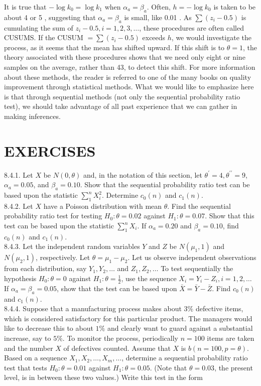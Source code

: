 It is true that $-\log k_{0}=\log k_{1}$ when $\alpha_{a}=\beta_{a}$. Often, $h=-\log k_{0}$ is taken to be about 4 or 5 , suggesting that $\alpha_{a}=\beta_{a}$ is small, like 0.01 . As $\sum\left(z_{i}-0.5\right)$ is cumulating the sum of $z_{i}-0.5, i=1,2,3, \ldots$, these procedures are often called CUSUMS. If the CUSUM $=\sum\left(z_{i}-0.5\right)$ exceeds $h$, we would investigate the process, as it seems that the mean has shifted upward. If this shift is to $\theta=1$, the theory associated with these procedures shows that we need only eight or nine samples on the average, rather than 43, to detect this shift. For more information about these methods, the reader is referred to one of the many books on quality improvement through statistical methods. What we would like to emphasize here is that through sequential methods (not only the sequential probability ratio test), we should take advantage of all past experience that we can gather in making inferences.

\section*{EXERCISES}
8.4.1. Let $X$ be $N(0, \theta)$ and, in the notation of this section, let $\theta^{\prime}=4, \theta^{\prime \prime}=9$, $\alpha_{a}=0.05$, and $\beta_{a}=0.10$. Show that the sequential probability ratio test can be based upon the statistic $\sum_{1}^{n} X_{i}^{2}$. Determine $c_{0}(n)$ and $c_{1}(n)$.\\
8.4.2. Let $X$ have a Poisson distribution with mean $\theta$. Find the sequential probability ratio test for testing $H_{0}: \theta=0.02$ against $H_{1}: \theta=0.07$. Show that this test can be based upon the statistic $\sum_{1}^{n} X_{i}$. If $\alpha_{a}=0.20$ and $\beta_{a}=0.10$, find $c_{0}(n)$ and $c_{1}(n)$.\\
8.4.3. Let the independent random variables $Y$ and $Z$ be $N\left(\mu_{1}, 1\right)$ and $N\left(\mu_{2}, 1\right)$, respectively. Let $\theta=\mu_{1}-\mu_{2}$. Let us observe independent observations from each distribution, say $Y_{1}, Y_{2}, \ldots$ and $Z_{1}, Z_{2}, \ldots$ To test sequentially the hypothesis $H_{0}: \theta=0$ against $H_{1}: \theta=\frac{1}{2}$, use the sequence $X_{i}=Y_{i}-Z_{i}, i=1,2, \ldots$ If $\alpha_{a}=\beta_{a}=0.05$, show that the test can be based upon $\bar{X}=\bar{Y}-\bar{Z}$. Find $c_{0}(n)$ and $c_{1}(n)$.\\
8.4.4. Suppose that a manufacturing process makes about $3 \%$ defective items, which is considered satisfactory for this particular product. The managers would like to decrease this to about $1 \%$ and clearly want to guard against a substantial increase, say to $5 \%$. To monitor the process, periodically $n=100$ items are taken and the number $X$ of defectives counted. Assume that $X$ is $b(n=100, p=\theta)$. Based on a sequence $X_{1}, X_{2}, \ldots, X_{m}, \ldots$, determine a sequential probability ratio test that tests $H_{0}: \theta=0.01$ against $H_{1}: \theta=0.05$. (Note that $\theta=0.03$, the present level, is in between these two values.) Write this test in the form

